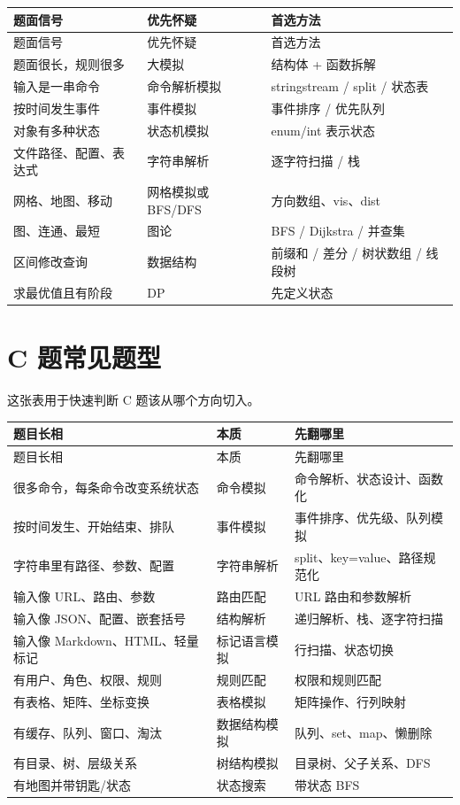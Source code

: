 \begin{longtable}{p{4cm}p{5cm}p{5cm}}
\toprule
题面信号 & 优先怀疑 & 首选方法 \\
\midrule
\endfirsthead
\toprule
题面信号 & 优先怀疑 & 首选方法 \\
\midrule
\endhead
题面很长，规则很多 & 大模拟 & 结构体 + 函数拆解 \\
输入是一串命令 & 命令解析模拟 & stringstream / split / 状态表 \\
按时间发生事件 & 事件模拟 & 事件排序 / 优先队列 \\
对象有多种状态 & 状态机模拟 & enum/int 表示状态 \\
文件路径、配置、表达式 & 字符串解析 & 逐字符扫描 / 栈 \\
网格、地图、移动 & 网格模拟或 BFS/DFS & 方向数组、vis、dist \\
图、连通、最短 & 图论 & BFS / Dijkstra / 并查集 \\
区间修改查询 & 数据结构 & 前缀和 / 差分 / 树状数组 / 线段树 \\
求最优值且有阶段 & DP & 先定义状态 \\
\bottomrule
\end{longtable}

\section{C 题常见题型}\label{sec:07-7}

这张表用于快速判断 C 题该从哪个方向切入。

\begin{longtable}{p{4cm}p{5cm}p{5cm}}
\toprule
题目长相 & 本质 & 先翻哪里 \\
\midrule
\endfirsthead
\toprule
题目长相 & 本质 & 先翻哪里 \\
\midrule
\endhead
很多命令，每条命令改变系统状态 & 命令模拟 & 命令解析、状态设计、函数化 \\
按时间发生、开始结束、排队 & 事件模拟 & 事件排序、优先级、队列模拟 \\
字符串里有路径、参数、配置 & 字符串解析 & split、key=value、路径规范化 \\
输入像 URL、路由、参数 & 路由匹配 & URL 路由和参数解析 \\
输入像 JSON、配置、嵌套括号 & 结构解析 & 递归解析、栈、逐字符扫描 \\
输入像 Markdown、HTML、轻量标记 & 标记语言模拟 & 行扫描、状态切换 \\
有用户、角色、权限、规则 & 规则匹配 & 权限和规则匹配 \\
有表格、矩阵、坐标变换 & 表格模拟 & 矩阵操作、行列映射 \\
有缓存、队列、窗口、淘汰 & 数据结构模拟 & 队列、set、map、懒删除 \\
有目录、树、层级关系 & 树结构模拟 & 目录树、父子关系、DFS \\
有地图并带钥匙/状态 & 状态搜索 & 带状态 BFS \\
\bottomrule
\end{longtable}


